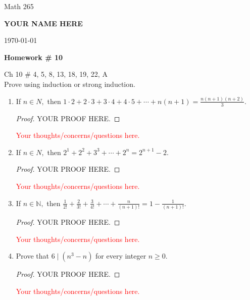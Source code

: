 \documentclass[11pt]{report}
\theoremstyle{plain}
\newcommand{\N}{\mathbb{N}}
\begin{document}
\hfill Math 265

\hfill \textbf{YOUR NAME HERE}

\hfill \today

\begin{center}
\Large{\textbf{Homework \# 10}} \\

\end{center}

\noindent{} \quad Ch 10 \# 4, 5, 8, 13, 18, 19, 22, A\\

\noindent{} Prove using induction or strong induction.\\

\begin{enumerate}
\item[\textbf{4.}] If $n \in N,$ then $1\cdot 2+2 \cdot 3 + 3 \cdot 4 + 4 \cdot 5 + \cdots + n(n+1)=\frac{n(n+1)(n+2)}{3}$. \\
\begin{proof} YOUR PROOF HERE.
\end{proof}
\textcolor{red}{Your thoughts/concerns/questions here.}
\vspace{1in}
\item[\textbf{5.}] If $n \in N,$ then $2^1+2^2+3^3+\cdots+2^n=2^{n+1}-2$.\\
\begin{proof} YOUR PROOF HERE.
\end{proof}
\textcolor{red}{Your thoughts/concerns/questions here.}
\vspace{1in}
\item[\textbf{8.}] If  $n \in \N,$ then $\frac{1}{2!}+\frac{2}{3!}+\frac{3}{4!}+\cdots+\frac{n}{(n+1)!}=1-\frac{1}{(n+1)!}.$
\begin{proof} YOUR PROOF HERE.
\end{proof}
\textcolor{red}{Your thoughts/concerns/questions here.}
\vspace{1in}
\item[\textbf{13.}] Prove that $6 \mid (n^3-n)$ for every integer $n \geq 0.$\\
\begin{proof} YOUR PROOF HERE.
\end{proof}
\textcolor{red}{Your thoughts/concerns/questions here.}
\vspace{1in}

\end{enumerate}
\end{document}
